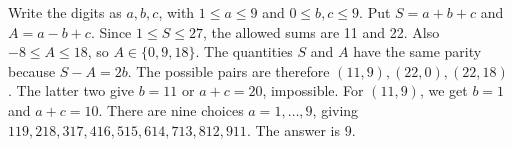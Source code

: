 Write the digits as $a,b,c$, with $1\le a\le9$ and $0\le b,c\le9$. Put $S=a+b+c$ and $A=a-b+c$. Since $1\le S\le27$, the allowed sums are 11 and 22. Also $-8\le A\le18$, so $A\in\{0,9,18\}$. The quantities $S$ and $A$ have the same parity because $S-A=2b$. The possible pairs are therefore $(11,9),(22,0),(22,18)$. The latter two give $b=11$ or $a+c=20$, impossible. For $(11,9)$, we get $b=1$ and $a+c=10$. There are nine choices $a=1,\ldots,9$, giving $119,218,317,416,515,614,713,812,911$. The answer is $\boxed9$.
